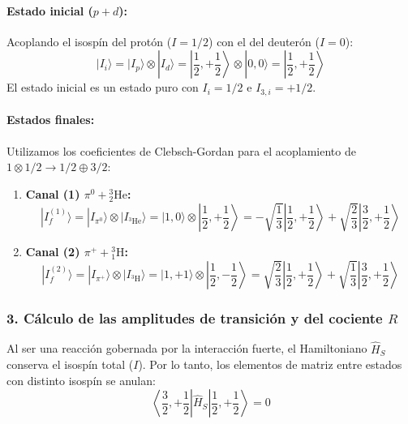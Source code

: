 \paragraph{Estado inicial ($p + d$):}
Acoplando el isospín del protón ($I = 1/2$) con el del deuterón ($I = 0$):
\begin{equation}
    |I_i\rangle = |I_p\rangle \otimes |I_d\rangle = \left|\frac{1}{2}, +\frac{1}{2}\right\rangle \otimes |0, 0\rangle = \left|\frac{1}{2}, +\frac{1}{2}\right\rangle
\end{equation}
El estado inicial es un estado puro con $I_i = 1/2$ e $I_{3,i} = +1/2$.

\paragraph{Estados finales:}
Utilizamos los coeficientes de Clebsch-Gordan para el acoplamiento de $1 \otimes 1/2 \to 1/2 \oplus 3/2$:

\begin{enumerate}
    \item \textbf{Canal (1) $\pi^0 + {^3_2\text{He}}$:}
    \begin{equation}
        |I_f^{(1)}\rangle = |I_{\pi^0}\rangle \otimes |I_{{^3\text{He}}}\rangle = |1, 0\rangle \otimes \left|\frac{1}{2}, +\frac{1}{2}\right\rangle = -\sqrt{\frac{1}{3}} \left|\frac{1}{2}, +\frac{1}{2}\right\rangle + \sqrt{\frac{2}{3}} \left|\frac{3}{2}, +\frac{1}{2}\right\rangle
    \end{equation}

    \item \textbf{Canal (2) $\pi^+ + {^3_1\text{H}}$:}
    \begin{equation}
        |I_f^{(2)}\rangle = |I_{\pi^+}\rangle \otimes |I_{{^3\text{H}}}\rangle = |1, +1\rangle \otimes \left|\frac{1}{2}, -\frac{1}{2}\right\rangle = \sqrt{\frac{2}{3}} \left|\frac{1}{2}, +\frac{1}{2}\right\rangle + \sqrt{\frac{1}{3}} \left|\frac{3}{2}, +\frac{1}{2}\right\rangle
    \end{equation}
\end{enumerate}

\subsubsection*{3. Cálculo de las amplitudes de transición y del cociente $R$}

Al ser una reacción gobernada por la interacción fuerte, el Hamiltoniano $\hat{H}_S$ conserva el isospín total ($I$). Por lo tanto, los elementos de matriz entre estados con distinto isospín se anulan:
\begin{equation}
    \left\langle \frac{3}{2}, +\frac{1}{2} \right| \hat{H}_S \left| \frac{1}{2}, +\frac{1}{2} \right\rangle = 0
\end{equation}


